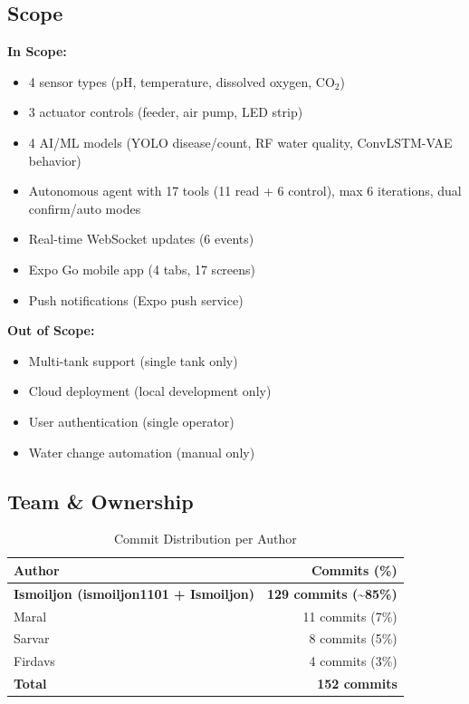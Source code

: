 \documentclass[12pt,a4paper,oneside]{article}
\begin{document}
\subsection{Scope}
\textbf{In Scope:}
\begin{itemize}
    \item 4 sensor types (pH, temperature, dissolved oxygen, CO$_2$)
    \item 3 actuator controls (feeder, air pump, LED strip)
    \item 4 AI/ML models (YOLO disease/count, RF water quality, ConvLSTM-VAE behavior)
    \item Autonomous agent with 17 tools (11 read + 6 control), max 6 iterations, dual confirm/auto modes
    \item Real-time WebSocket updates (6 events)
    \item Expo Go mobile app (4 tabs, 17 screens)
    \item Push notifications (Expo push service)
\end{itemize}

\textbf{Out of Scope:}
\begin{itemize}
    \item Multi-tank support (single tank only)
    \item Cloud deployment (local development only)
    \item User authentication (single operator)
    \item Water change automation (manual only)
\end{itemize}

\subsection{Team \& Ownership}
\begin{table}[H]
    \centering\small
    \begin{tabularx}{\textwidth}{Xr}
        \toprule
        \textbf{Author} & \textbf{Commits (\%)} \\
        \midrule
        \textbf{Ismoiljon (ismoiljon1101 + Ismoiljon)} & \textbf{129 commits (\textasciitilde85\%)} \\
        Maral & 11 commits (7\%) \\
        Sarvar & 8 commits (5\%) \\
        Firdavs & 4 commits (3\%) \\
        \textbf{Total} & \textbf{152 commits} \\
        \bottomrule
    \end{tabularx}
    \caption{Commit Distribution per Author}
\end{table}
\end{document}
